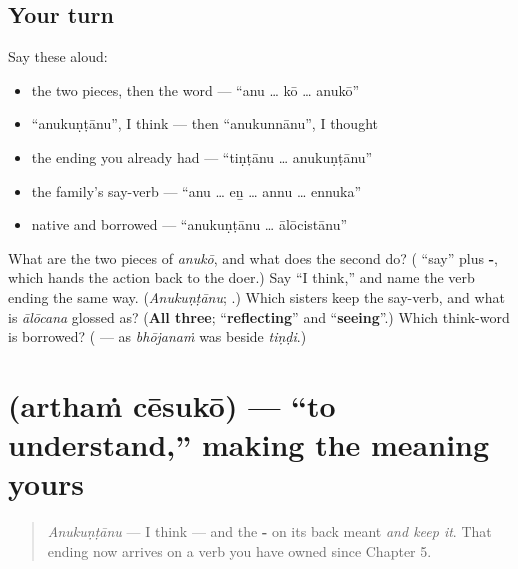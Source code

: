 \subsection*{Your turn}
Say these aloud:

\begin{itemize}
\raggedright
  \item the two pieces, then the word — \textquotedblleft{}anu … kō … anukō\textquotedblright{}
  \item \textquotedblleft{}anukuṇṭānu\textquotedblright{}, I think — then \textquotedblleft{}anukunnānu\textquotedblright{}, I thought
  \item the ending you already had — \textquotedblleft{}tiṇṭānu … anukuṇṭānu\textquotedblright{}
  \item the family's say-verb — \textquotedblleft{}anu … eṉ … annu … ennuka\textquotedblright{}
  \item native and borrowed — \textquotedblleft{}anukuṇṭānu … ālōcistānu\textquotedblright{}
\end{itemize}

\begin{tcolorbox}[breakable,colback=teal!4,colframe=teal!35!black,title={Before you move on}]
What are the two pieces of \emph{anukō}, and what does the second do? (\emph{\textbf{}} \textquotedblleft{}say\textquotedblright{} plus \textbf{-}, which hands the action back to the doer.) Say \textquotedblleft{}I think,\textquotedblright{} and name the verb ending the same way. (\emph{Anukuṇṭānu}; \textbf{}.) Which sisters keep the say-verb, and what is \emph{ālōcana} glossed as? (\textbf{All three}; \textquotedblleft{}\textbf{reflecting}\textquotedblright{} and \textquotedblleft{}\textbf{seeing}\textquotedblright{}.) Which think-word is borrowed? (\textbf{} — as \emph{bhōjanaṁ} was beside \emph{tiṇḍi}.)
\end{tcolorbox}
\section[\texorpdfstring{\te{అర్థం} \te{చేసుకో} (arthaṁ cēsukō)}{అర్థం చేసుకో (arthaṁ cēsukō)}]{  (arthaṁ cēsukō) — \textquotedblleft{}to understand,\textquotedblright{} making the meaning yours}

\label{lesson:TE-C33-artham-cesuko}



\begin{quote}
\emph{Anukuṇṭānu} — I think — and the \textbf{-} on its back meant \emph{and keep it}. That ending now arrives on a verb you have owned since Chapter 5.
\end{quote}

